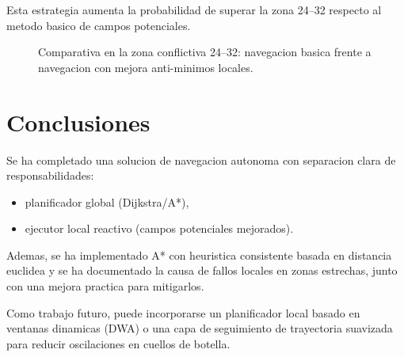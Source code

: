 \documentclass[12pt]{article}
\begin{document}
Esta estrategia aumenta la probabilidad de superar la zona 24--32 respecto al metodo basico de campos potenciales.

\begin{figure}[H]
  \centering
  \caption{Comparativa en la zona conflictiva 24--32: navegacion basica frente a navegacion con mejora anti-minimos locales.}
  \label{fig:nav_zona_24_32}
\end{figure}

\section{Conclusiones}

Se ha completado una solucion de navegacion autonoma con separacion clara de responsabilidades:
\begin{itemize}[leftmargin=2em]
  \item planificador global (Dijkstra/A*),
  \item ejecutor local reactivo (campos potenciales mejorados).
\end{itemize}

Ademas, se ha implementado A* con heuristica consistente basada en distancia euclidea y se ha documentado la causa de fallos locales en zonas estrechas, junto con una mejora practica para mitigarlos.

Como trabajo futuro, puede incorporarse un planificador local basado en ventanas dinamicas (DWA) o una capa de seguimiento de trayectoria suavizada para reducir oscilaciones en cuellos de botella.
\end{document}
